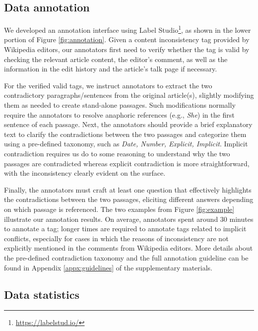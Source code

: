 \subsection{Data annotation}
We developed an annotation interface using Label Studio\footnote{\url{https://labelstud.io/}}, as shown in the lower portion of Figure \ref{fig:annotation}. Given a content inconsistency tag provided by Wikipedia editors, our annotators first need to verify whether the tag is valid by checking the relevant article content, the editor's comment, as well as the information in the edit history and the article's talk page if necessary.   

For the verified valid tags, we instruct annotators to extract the two contradictory paragraphs/sentences from the original article(s), slightly modifying them as needed to create stand-alone passages. Such modifications normally require the annotators to resolve anaphoric references (e.g., \emph{She}) in the first sentence of each passage. Next, the annotators should provide a brief explanatory text to clarify the contradictions between the two passages and categorize them using a pre-defined taxonomy, such as \emph{Date, Number, Explicit, Implicit}. Implicit contradiction requires us do to some reasoning to understand why the two passages are contradicted 
whereas explicit contradiction is more straightforward, with the inconsistency clearly evident on the surface.


Finally, the annotators must craft at least one question that effectively highlights the contradictions between the two passages, eliciting different answers depending on which passage is referenced. The two examples from Figure \ref{fig:example} illustrate our annotation results. On average, annotators spent around 30 minutes to annotate a tag; longer times are required to annotate tags related to implicit conflicts, especially for cases in which the reasons of inconsistency are not explicitly mentioned in the comments from Wikipedia editors.  More details about the pre-defined contradiction taxonomy and the full annotation guideline can be found in Appendix \ref{appx:guidelines} of the supplementary materials.

\subsection{Data statistics}


